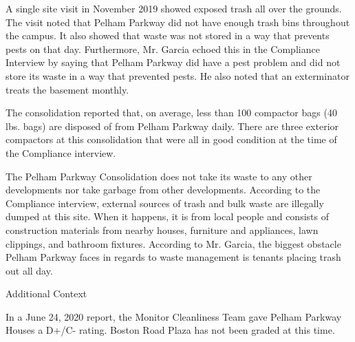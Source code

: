  

A single site visit in November 2019 showed exposed trash all over the grounds. The visit noted that Pelham Parkway did not have enough trash bins throughout the campus. It also showed that waste was not stored in a way that prevents pests on that day. Furthermore, Mr. Garcia echoed this in the Compliance Interview by saying that Pelham Parkway did have a pest problem and did not store its waste in a way that prevented pests. He also noted that an exterminator treats the basement monthly. 



The consolidation reported that, on average, less than 100 compactor bags (40 lbs. bags)  are disposed of from Pelham Parkway daily.  There are three exterior compactors at this consolidation that were all in good condition at the time of the Compliance interview.   



The Pelham Parkway Consolidation does not take its waste to any other developments nor take garbage from other developments.  According to the Compliance interview, external sources of trash and bulk waste are illegally dumped at this site. When it happens, it is from local people and consists of construction materials from nearby houses, furniture and appliances, lawn clippings, and bathroom fixtures.  According to Mr. Garcia, the biggest obstacle Pelham Parkway faces in regards to waste management is tenants placing trash out all day. 



Additional Context

In a June 24, 2020 report, the Monitor Cleanliness Team gave Pelham Parkway Houses a D+/C- rating.  Boston Road Plaza has not been graded at this time.